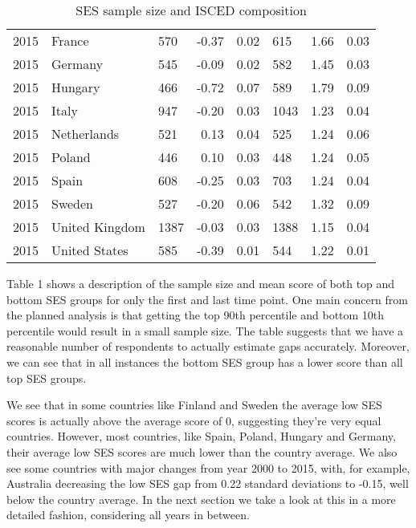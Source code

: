 \documentclass[11pt, a4paper]{article}\usepackage[]{graphicx}\usepackage[]{color}
\begin{document}
\begin{table}[ht]
\begin{tabular}{lllrrlrr}
  2015 & France & 570 & -0.37 & 0.02 & 615 & 1.66 & 0.03 \\ 
  2015 & Germany & 545 & -0.09 & 0.02 & 582 & 1.45 & 0.03 \\ 
  2015 & Hungary & 466 & -0.72 & 0.07 & 589 & 1.79 & 0.09 \\ 
  2015 & Italy & 947 & -0.20 & 0.03 & 1043 & 1.23 & 0.04 \\ 
  2015 & Netherlands & 521 & 0.13 & 0.04 & 525 & 1.24 & 0.06 \\ 
  2015 & Poland & 446 & 0.10 & 0.03 & 448 & 1.24 & 0.05 \\ 
  2015 & Spain & 608 & -0.25 & 0.03 & 703 & 1.24 & 0.04 \\ 
  2015 & Sweden & 527 & -0.20 & 0.06 & 542 & 1.32 & 0.09 \\ 
  2015 & United Kingdom & 1387 & -0.03 & 0.03 & 1388 & 1.15 & 0.04 \\ 
  2015 & United States & 585 & -0.39 & 0.01 & 544 & 1.22 & 0.01 \\ 
   \hline
\end{tabular}
\caption{SES sample size and ISCED composition} 
\end{table}


Table 1 shows a description of the sample size and mean score of both top and bottom SES groups for only the first and last time point. One main concern from the planned analysis is that getting the top 90th percentile and bottom 10th percentile would result in a small sample size. The table suggests that we have a reasonable number of respondents to actually estimate gaps accurately. Moreover, we can see that in all instances the bottom SES group has a lower score than all top SES groups.

We see that in some countries like Finland and Sweden the average low SES scores is actually above the average score of 0, suggesting they're very equal countries. However, most countries, like Spain, Poland, Hungary and Germany, their average low SES scores are much lower than the country average. We also see some countries with major changes from year 2000 to 2015, with, for example, Australia decreasing the low SES gap from 0.22 standard deviations to -0.15, well below the country average. In the next section we take a look at this in a more detailed fashion, considering all years in between.





\end{document}

